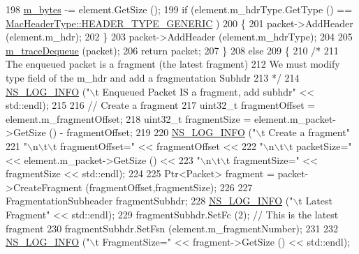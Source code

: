 \begin{DoxyCode}
198           \hyperlink{classns3_1_1WimaxMacQueue_a79c3fd93dfef8c78b074c2aa6f2266ea}{m\_bytes} -= element.GetSize ();
199           \textcolor{keywordflow}{if} (element.m\_hdrType.GetType () == \hyperlink{classns3_1_1MacHeaderType_a54d8fc8bc93a2b7865627965cdd31c20a48fe5b2f20cadf78008c71469b518403}{MacHeaderType::HEADER\_TYPE\_GENERIC}
      )
200             \{
201               packet->AddHeader (element.m\_hdr);
202             \}
203           packet->AddHeader (element.m\_hdrType);
204 
205           \hyperlink{classns3_1_1WimaxMacQueue_a3a84896e087a831d26cb904927e8cbed}{m\_traceDequeue} (packet);
206           \textcolor{keywordflow}{return} packet;
207         \}
208       \textcolor{keywordflow}{else}
209         \{
210           \textcolor{comment}{/*}
211 \textcolor{comment}{           The enqueued packet is a fragment (the latest fragment)}
212 \textcolor{comment}{           We must modify type field of the m\_hdr and add a fragmentation Subhdr}
213 \textcolor{comment}{           */}
214           \hyperlink{group__logging_gafbd73ee2cf9f26b319f49086d8e860fb}{NS\_LOG\_INFO} (\textcolor{stringliteral}{"\(\backslash\)t Enqueued Packet IS a fragment, add subhdr"} << std::endl);
215 
216           \textcolor{comment}{// Create a fragment}
217           uint32\_t fragmentOffset = element.m\_fragmentOffset;
218           uint32\_t fragmentSize = element.m\_packet->GetSize () - fragmentOffset;
219 
220           \hyperlink{group__logging_gafbd73ee2cf9f26b319f49086d8e860fb}{NS\_LOG\_INFO} (\textcolor{stringliteral}{"\(\backslash\)t Create a fragment"}
221                        \textcolor{stringliteral}{"\(\backslash\)n\(\backslash\)t\(\backslash\)t fragmentOffset="} << fragmentOffset <<
222                        \textcolor{stringliteral}{"\(\backslash\)n\(\backslash\)t\(\backslash\)t packetSize="} << element.m\_packet->GetSize () <<
223                        \textcolor{stringliteral}{"\(\backslash\)n\(\backslash\)t\(\backslash\)t fragmentSize="} << fragmentSize << std::endl);
224 
225           Ptr<Packet> fragment = packet->CreateFragment (fragmentOffset,fragmentSize);
226 
227           FragmentationSubheader fragmentSubhdr;
228           \hyperlink{group__logging_gafbd73ee2cf9f26b319f49086d8e860fb}{NS\_LOG\_INFO} (\textcolor{stringliteral}{"\(\backslash\)t Latest Fragment"} << std::endl);
229           fragmentSubhdr.SetFc (2);   \textcolor{comment}{// This is the latest fragment}
230           fragmentSubhdr.SetFsn (element.m\_fragmentNumber);
231 
232           \hyperlink{group__logging_gafbd73ee2cf9f26b319f49086d8e860fb}{NS\_LOG\_INFO} (\textcolor{stringliteral}{"\(\backslash\)t FragmentSize="} << fragment->GetSize () << std::endl);

\end{DoxyCode}
